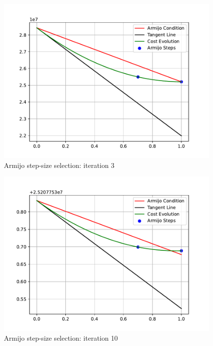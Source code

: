 \begin{figure}[htb]
    \centering
    \includegraphics[width=1\linewidth]{img/2-task2/Armijo_iter_3.pdf}
    \caption{Armijo step-size selection: iteration 3}
    \label{fig:armijo1}
\end{figure}

\begin{figure}[htb]
    \centering
    \includegraphics[width=1\linewidth]{img/2-task2/Armijo_iter_10.pdf}
    \caption{Armijo step-size selection: iteration 10}
    \label{fig:armijo1}
\end{figure}

